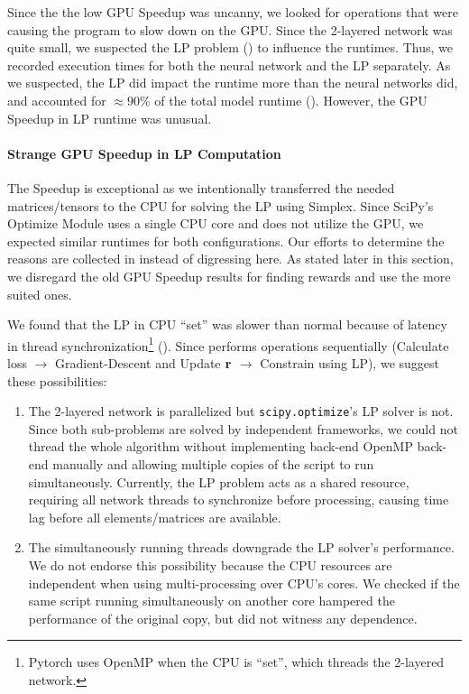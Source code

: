 Since the the low GPU Speedup was uncanny, we looked for operations that were causing the program to slow down on the GPU. Since the 2-layered network was quite small, we suspected the LP problem () to influence the runtimes. Thus, we recorded execution times for both the neural network and the LP separately. As we suspected, the LP did impact the runtime more than the neural networks did, and accounted for $\approx 90 \%$ of the total model runtime (). However, the GPU Speedup in LP runtime was unusual.

\paragraph{Strange GPU Speedup in LP Computation}
The Speedup is exceptional as we intentionally transferred the needed matrices/tensors to the CPU for solving the LP using Simplex. Since SciPy's Optimize Module uses a single CPU core and does not utilize the GPU, we expected similar runtimes for both configurations. Our efforts to determine the reasons are collected in  instead of digressing here. As stated later in this section, we disregard the old GPU Speedup results for finding rewards and use the more suited ones.

We found that the LP in CPU ``set'' was slower than normal because of latency in thread synchronization\footnote{Pytorch uses OpenMP \cite{PTDocs,OpenMP} when the CPU is ``set'', which threads the 2-layered network.} (). Since  performs operations sequentially (Calculate loss $\rightarrow$ Gradient-Descent and Update $\mathbf{r}$ $\rightarrow$ Constrain using LP), we suggest these possibilities:
\begin{enumerate}
    \item The 2-layered network is parallelized but \texttt{scipy.optimize}'s LP solver is not. Since both sub-problems are solved by independent frameworks, we could not thread the whole algorithm without implementing back-end OpenMP \cite{OpenMP} back-end manually and allowing multiple copies of the script to run simultaneously. Currently, the LP problem acts as a shared resource, requiring all network threads to synchronize before processing, causing time lag before all elements/matrices are available.
    \item The simultaneously running threads downgrade the LP solver's performance. We do not endorse this possibility because the CPU resources are independent when using multi-processing over CPU's cores. We checked if the same script running simultaneously on another core hampered the performance of the original copy, but did not witness any dependence.
\end{enumerate}

